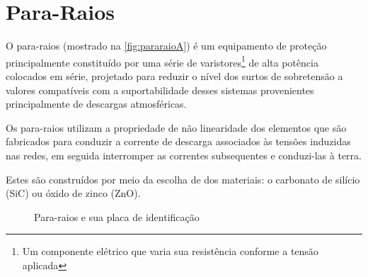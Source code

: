 \documentclass[a5paper,english,spanish,brazil]{ufsc-thesis}
\begin{document}
	\section{Para-Raios}
		O para-raios (mostrado na \autoref{fig:pararaioA}) é um equipamento de proteção principalmente constituído por uma série de varistores\footnote{Um componente elétrico que varia sua resistência conforme a tensão aplicada\cite[p. 413]{BellSytemHistory}} de alta potência colocados em série, projetado para reduzir o nível dos surtos de sobretensão a valores compatíveis com a suportabilidade desses sistemas provenientes principalmente de descargas atmosféricas.\par
		Os para-raios utilizam a propriedade de não linearidade dos elementos que são fabricados para conduzir a corrente de descarga associados às tensões induzidas nas redes, em seguida interromper as correntes subsequentes e conduzi-las à terra.\par
		Estes são construídos por meio da escolha de dos materiais: o carbonato de silício (SiC) ou óxido de zinco (ZnO). 

		\begin{figure}[htb]
		  \caption{Para-raios e sua placa de identificação}
		  \centering
		\end{figure}
\end{document}

